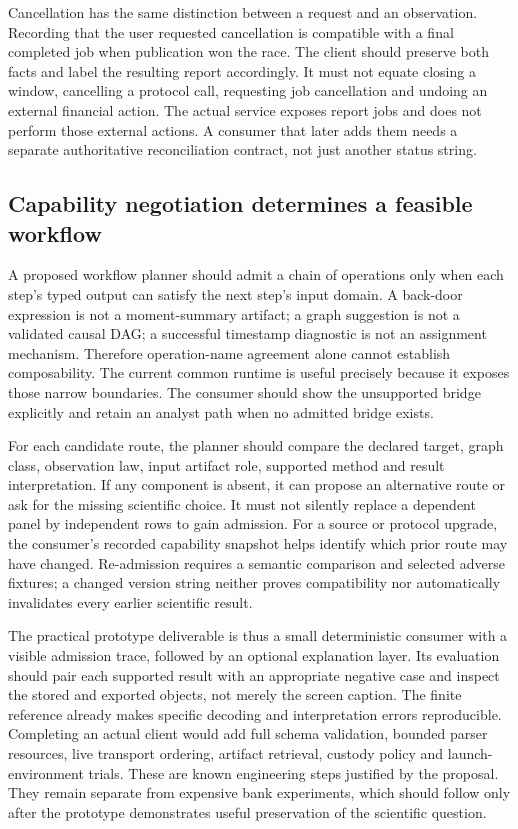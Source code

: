 Cancellation has the same distinction between a request and an observation.
Recording that the user requested cancellation is compatible with a final
completed job when publication won the race. The client should preserve both
facts and label the resulting report accordingly. It must not equate closing
a window, cancelling a protocol call, requesting job cancellation and undoing
an external financial action. The actual service exposes report jobs and
does not perform those external actions. A consumer that later adds them
needs a separate authoritative reconciliation contract, not just another
status string.

\subsection{Capability negotiation determines a feasible workflow}

A proposed workflow planner should admit a chain of operations only when
each step's typed output can satisfy the next step's input domain. A
back-door expression is not a moment-summary artifact; a graph suggestion
is not a validated causal DAG; a successful timestamp diagnostic is not an
assignment mechanism. Therefore operation-name agreement alone cannot
establish composability. The current common runtime is useful precisely
because it exposes those narrow boundaries. The consumer should show the
unsupported bridge explicitly and retain an analyst path when no admitted
bridge exists.

For each candidate route, the planner should compare the declared target,
graph class, observation law, input artifact role, supported method and
result interpretation. If any component is absent, it can propose an
alternative route or ask for the missing scientific choice. It must not
silently replace a dependent panel by independent rows to gain admission.
For a source or protocol upgrade, the consumer's recorded capability snapshot
helps identify which prior route may have changed. Re-admission requires a
semantic comparison and selected adverse fixtures; a changed version string
neither proves compatibility nor automatically invalidates every earlier
scientific result.

The practical prototype deliverable is thus a small deterministic consumer
with a visible admission trace, followed by an optional explanation layer.
Its evaluation should pair each supported result with an appropriate
negative case and inspect the stored and exported objects, not merely the
screen caption. The finite reference already makes specific decoding and
interpretation errors reproducible. Completing an actual client would add
full schema validation, bounded parser resources, live transport ordering,
artifact retrieval, custody policy and launch-environment trials. These are
known engineering steps justified by the proposal. They remain separate
from expensive bank experiments, which should follow only after the
prototype demonstrates useful preservation of the scientific question.
\label{exec17:i2-admission-end}
